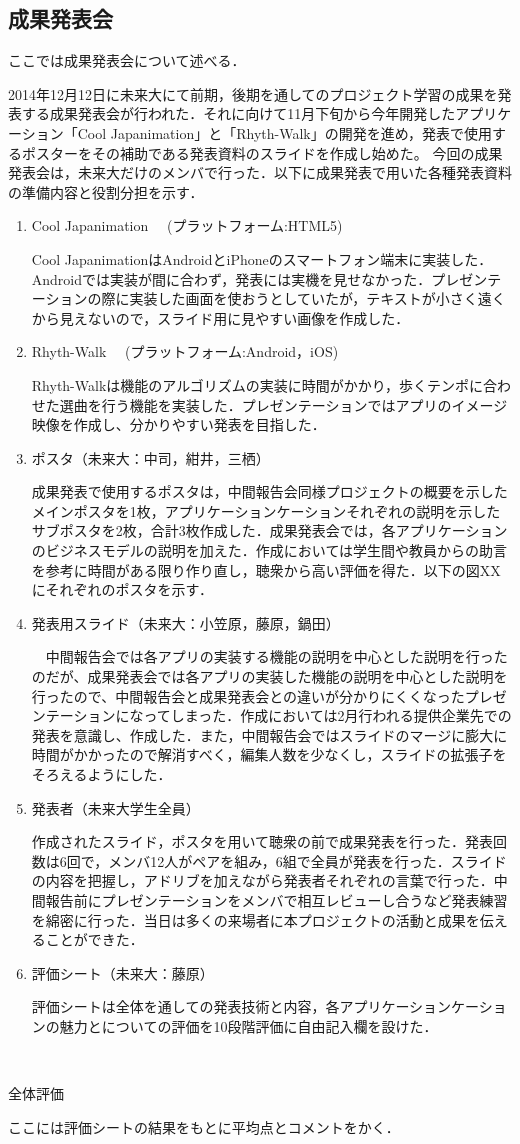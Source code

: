 \subsection{成果発表会}
\par
ここでは成果発表会について述べる．
\par
 2014年12月12日に未来大にて前期，後期を通してのプロジェクト学習の成果を発表する成果発表会が行われた．それに向けて11月下旬から今年開発したアプリケーション「Cool Japanimation」と「Rhyth-Walk」の開発を進め，発表で使用するポスターをその補助である発表資料のスライドを作成し始めた。
今回の成果発表会は，未来大だけのメンバで行った．以下に成果発表で用いた各種発表資料の準備内容と役割分担を示す．
\begin{enumerate}
\item Cool Japanimation　 (プラットフォーム:HTML5)
\par
 Cool JapanimationはAndroidとiPhoneのスマートフォン端末に実装した．Androidでは実装が間に合わず，発表には実機を見せなかった．プレゼンテーションの際に実装した画面を使おうとしていたが，テキストが小さく遠くから見えないので，スライド用に見やすい画像を作成した．
\par
\item Rhyth-Walk　 (プラットフォーム:Android，iOS)
\par
 Rhyth-Walkは機能のアルゴリズムの実装に時間がかかり，歩くテンポに合わせた選曲を行う機能を実装した．プレゼンテーションではアプリのイメージ映像を作成し、分かりやすい発表を目指した．
\item ポスタ（未来大：中司，紺井，三栖）
\par
 成果発表で使用するポスタは，中間報告会同様プロジェクトの概要を示したメインポスタを1枚，アプリケーションケーションそれぞれの説明を示したサブポスタを2枚，合計3枚作成した．成果発表会では，各アプリケーションのビジネスモデルの説明を加えた．作成においては学生間や教員からの助言を参考に時間がある限り作り直し，聴衆から高い評価を得た．以下の図XXにそれぞれのポスタを示す． 
\item 発表用スライド（未来大：小笠原，藤原，鍋田）
\par
　中間報告会では各アプリの実装する機能の説明を中心とした説明を行ったのだが、成果発表会では各アプリの実装した機能の説明を中心とした説明を行ったので、中間報告会と成果発表会との違いが分かりにくくなったプレゼンテーションになってしまった．作成においては2月行われる提供企業先での発表を意識し、作成した．また，中間報告会ではスライドのマージに膨大に時間がかかったので解消すべく，編集人数を少なくし，スライドの拡張子をそろえるようにした． \item 発表者（未来大学生全員）
\par
作成されたスライド，ポスタを用いて聴衆の前で成果発表を行った．発表回数は6回で，メンバ12人がペアを組み，6組で全員が発表を行った．スライドの内容を把握し，アドリブを加えながら発表者それぞれの言葉で行った．中間報告前にプレゼンテーションをメンバで相互レビューし合うなど発表練習を綿密に行った．当日は多くの来場者に本プロジェクトの活動と成果を伝えることができた．
\item 評価シート（未来大：藤原）
\par
評価シートは全体を通しての発表技術と内容，各アプリケーションケーションの魅力とについての評価を10段階評価に自由記入欄を設けた．

\end{enumerate}　
\par
全体評価
\par
ここには評価シートの結果をもとに平均点とコメントをかく．


